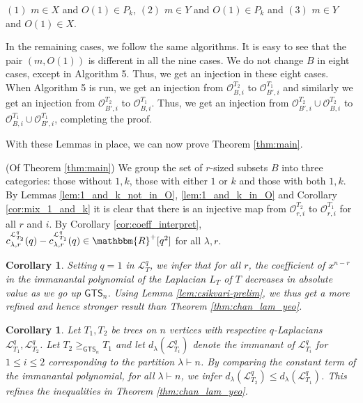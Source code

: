 \documentclass[12pt]{article}
\def\eod{\vrule height 6pt width 5pt depth 0pt}
\newenvironment{proof}{\noindent {\bf Proof:} \hspace{.2em}}
                      {\hspace*{\fill}{\eod}}
\newtheorem{corollary}[theorem]{Corollary}
\newcommand{\sL}{  \mathcal{ L}}
\newcommand{\sO}{  \mathcal{ O}}
\newcommand{\RR}{ \mathbbm{R}}
\newcommand{\GTS}{\mathsf{GTS}}
\begin{document}
\begin{proof}
\noindent
$(1)$ $m \in X$ and $O(1) \in P_k$, \hfill  
$(2)$ $m \in Y$ and $O(1) \in P_k$ and \hfill
$(3)$ $m \in Y$ and $O(1) \in X$.

In the remaining cases, we follow the same algorithms.
It is easy to see that the pair $(m, O(1))$ is different in all the  nine cases.
We do not change $B$ in eight cases, except in Algorithm 5.   Thus, 
we get an injection in these eight cases.  
When Algorithm 5 is run,
we get an injection from $\sO_{B,i}^{T_2}$ to $\sO_{B',i}^{T_1}$
and similarly we get an injection from
 $\sO_{B',i}^{T_2}$ to $\sO_{B,i}^{T_1}$.  Thus,
we get an injection from 
$\sO_{B',i}^{T_2} \cup \sO_{B,i}^{T_2}$ to $\sO_{B,i}^{T_1} 
\cup \sO_{B',i}^{T_1}$, completing the proof.
\end{proof}


\vspace{2 mm}

With these Lemmas in place, we can now prove Theorem \ref{thm:main}.

\vspace{2 mm}

\begin{proof} (Of Theorem \ref{thm:main}) 
We group the set of $r$-sized subsets $B$ into three categories:
those without $1,k$, those with either $1$ or $k$ and those
with both $1,k$.
By Lemmas \ref{lem:1_and_k_not_in_O}, \ref{lem:1_and_k_in_O} and 
Corollary \ref{cor:mix_1_and_k} it is clear that 
there is an injective map from 
$\sO_{r,i}^{T_2}$ to  $\sO_{r,i}^{T_1}$ for all $r$ and $i$.  By 
Corollary \ref{cor:coeff_interpret},
$c_{\lambda,r}^{\sL_{T_2}^q}(q) - c_{\lambda,r}^{\sL_{T_1}^q}(q) \in \RR^+[q^2]$
for all $\lambda, r$.  
\end{proof}


\begin{corollary}
Setting $q=1$ in $\sL_T^q$, we infer that for all $r$, the coefficient
of $x^{n-r}$ in the 
immanantal polynomial of the Laplacian $L_T$ of $T$ decreases 
in absolute value as we go up $\GTS_n$.
Using Lemma \ref{lem:csikvari-prelim}, we thus get a 
more refined and hence stronger result 
than Theorem \ref{thm:chan_lam_yeo}.
\end{corollary}




\begin{corollary}
\label{cor:immanant_q-Laplacian}
Let $T_1,T_2$ be trees on $n$ vertices with respective $q$-Laplacians 
$\sL_{T_1}^q, \sL_{T_2}^q$.   Let $T_2\geq_{\GTS_n} T_1$ and 
let $d_{\lambda}(\sL_{T_i}^q)$ denote the 
immanant of $\sL_{T_i}^q$ for $1\leq i \leq 2$ corresponding to the 
partition $\lambda \vdash n$.  By comparing the constant term of the
immanantal polynomial, for all $\lambda \vdash n$, 
we infer $d_{\lambda}(\sL_{T_2}^q) 
\leq  d_{\lambda}(\sL_{T_1}^q)$.  This refines the inequalities
in Theorem \ref{thm:chan_lam_yeo}.
\end{corollary}
\end{document}
